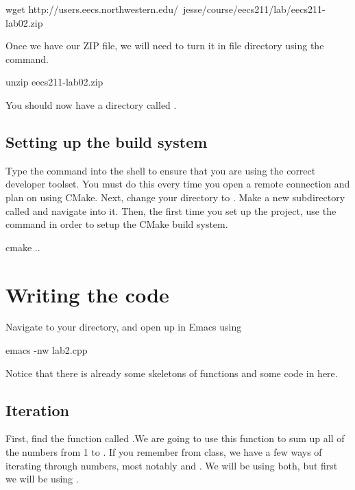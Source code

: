 \documentclass{tufte-handout}
\begin{document}
\begin{CmdLine}
  \prompt wget http://users.eecs.northwestern.edu/~jesse/course/eecs211/lab/eecs211-lab02.zip
\end{CmdLine}

Once we have our ZIP file, we will need to turn it in file directory using the  command.

\begin{CmdLine}
  \prompt unzip eecs211-lab02.zip
\end{CmdLine}

You should now have a directory called .

\subsection{Setting up the build system}
Type the  command into the shell to ensure that you are using the correct developer toolset. You must do this every time you open a remote connection and plan on using CMake. Next, change your directory to . Make a new
subdirectory called  and navigate into it. Then, the
first time you set up the project, use the command  in
order to setup the CMake build system.%
\begin{CmdLine}
  \prompt cmake ..
\end{CmdLine}

\section{Writing the code}
Navigate to your  directory, and open up  in Emacs using 
\begin{CmdLine}
  \prompt emacs -nw lab2.cpp 
\end{CmdLine}
Notice that there is already some skeletons of functions and some code in  here.

\subsection{Iteration}
First, find the function called .We are going to use this function to sum up all of the numbers from 1 to .  If you remember from class, we have a few ways of iterating through numbers, most notably  and .  We will be using both, but first we will be using .
\end{document}

